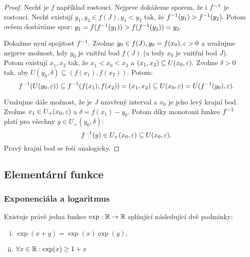 \begin{proof}
    Nechť je $f$ například rostoucí. Nejprve dokážeme sporem, že i $f^{-1}$
    je rostoucí. Nechť existují $y_1,y_2 \in f(J), y_1 < y_2$ tak, že $f^{-1}(y_1) 
    > f^{-1}(y_2).$ Potom ovšem dostáváme spor:
    $y_1 = f(f^{-1}(y_1)) > f(f^{-1}(y_2)) = y_2.$

    Dokažme nyní spojitost $f^{-1}.$ Zvolme $y_0 \in f(J), y_0 = f(x_0), \varepsilon > 0$ a 
    uvažujme nejprve možnost, kdy $y_0$ je vnitřní bod $f(J)$ (a tedy $x_0$ 
    je vnitřní bod $J$). Potom existují $x_1,x_2$ tak,
    že $x_1 < x_0 < x_2$ a $(x_1,x_2) \subseteq U(x_0, \varepsilon).$ Zvolme
    $\delta > 0$ tak, aby $U(y_0,\delta) \subseteq (f(x_1), f(x_2)).$ Potom:
    $$f^{-1}(U(y_0,\varepsilon)) \subseteq f^{-1}(f(x_1),f(x_2)) = (x_1,x_2) \subseteq
    U(x_0,\varepsilon) = U(f^{-1}(y_0),\varepsilon).$$

    Uvažujme dále možnost, že je $J$ uzavřený interval a $x_0$ je jeho levý 
    krajní bod. Zvolme $x_1 \in U_+(x_0, \varepsilon)$ a $\delta = f(x_1) - y_0.$ Potom
    díky monotonii funkce $f^{-1}$ platí pro všechny $y \in U_+(y_0, \delta):$
    $$f^{-1}(y) \in U_+(x_0, \varepsilon) \subseteq U(x_0, \varepsilon).$$
    Pravý krajní bod se řeší analogicky.
\end{proof}

\subsection{Elementární funkce}

\subsubsection{Exponenciála a logaritmus}

\begin{theorem}
    \label{th:exp}
    Existuje právě jedna funkce $\exp : \mathbb{R} \rightarrow \mathbb{R}$ splňující následující
    dvě podmínky:
    \begin{enumerate}[i.]
        \item $\exp(x+y) = \exp(x)\exp(y),$
        \item $\forall x \in \mathbb{R}: \exp(x) \geq 1+x$
    \end{enumerate}
\end{theorem}

